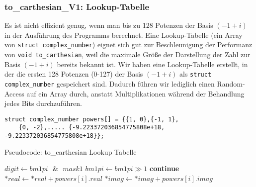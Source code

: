 \documentclass[course=erap]{aspdoc}
\begin{document}
\subsubsection{to\_carthesian\_V1: Lookup-Tabelle}
Es ist nicht effizient genug, wenn man bis zu 128 Potenzen der Basis $(-1 + i)$ in der Ausführung des Programms berechnet. Eine Lookup-Tabelle (ein Array von \texttt{struct complex\_number}) eignet sich gut zur Beschleunigung der Performanz von \texttt{void to\_carthesian}, weil die maximale Größe der Darstellung der Zahl zur Basis $(-1 + i)$ bereits bekannt ist. Wir haben eine Lookup-Tabelle erstellt, in der die ersten 128 Potenzen (0-127) der Basis $(-1 + i)$ als \texttt{struct complex\_number} gespeichert sind. Dadurch führen wir lediglich einen Random-Access auf ein Array durch, anstatt Multiplikationen während der Behandlung jedes Bits durchzuführen.
\begin{lstlisting}
struct complex_number powers[] = {{1, 0},{-1, 1},
    {0, -2},..... {-9.223372036854775808e+18, -9.223372036854775808e+18}};
\end{lstlisting}
\begin{algorithm}
\caption{Pseudocode: to\_carthesian Lookup Tabelle}
\begin{algorithmic}
\State $digit \gets bm1pi \text{ } \& \text{ } mask1$
\State $bm1pi \gets bm1pi \gg 1$
\State \textbf{continue}
\EndIf
\State $*real \gets *real + powers[i].real$
\State $*imag \gets *imag + powers[i].imag$
\EndFor
\end{algorithmic}
\end{algorithm}
\end{document}
